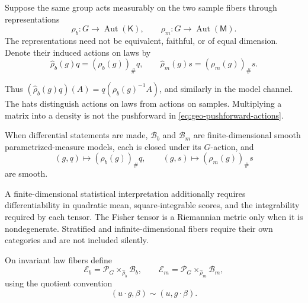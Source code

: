 Suppose the same group acts measurably on the two sample fibers through representations
\begin{equation}
\rho_b:G\longrightarrow\operatorname{Aut}(\mathsf K),
\qquad
\rho_m:G\longrightarrow\operatorname{Aut}(\mathsf M).
\label{eq:geo-representations}
\end{equation}
The representations need not be equivalent, faithful, or of equal dimension.  Denote their
induced actions on laws by
\begin{equation}
\widehat\rho_b(g)q=(\rho_b(g))_\#q,
\qquad
\widehat\rho_m(g)s=(\rho_m(g))_\#s.
\label{eq:geo-pushforward-actions}
\end{equation}

Thus $(\widehat\rho_b(g)q)(A)=q(\rho_b(g)^{-1}A)$, and similarly in the model channel.  The hats
distinguish actions on laws from actions on samples.  Multiplying a matrix into a
density is not the pushforward in \eqref{eq:geo-pushforward-actions}.

\medskip
{}
When differential statements are made, $\mathcal B_b$ and $\mathcal B_m$ are finite-dimensional
smooth parametrized-measure models, each is closed under its $G$-action, and
\begin{equation}
(g,q)\longmapsto(\rho_b(g))_\#q,
\qquad
(g,s)\longmapsto(\rho_m(g))_\#s
\label{eq:geo-smooth-actions}
\end{equation}
are smooth. 
\medskip

A finite-dimensional statistical interpretation additionally requires differentiability in
quadratic mean, square-integrable scores, and the integrability required by each tensor.  The
Fisher tensor is a Riemannian metric only when it is nondegenerate.  Stratified and
infinite-dimensional fibers require their own categories and are not included silently.

On invariant law fibers define
\begin{equation}
\mathcal E_b=\mathscr P_G\times_{\widehat\rho_b}\mathcal B_b,
\qquad
\mathcal E_m=\mathscr P_G\times_{\widehat\rho_m}\mathcal B_m,
\label{eq:geo-associated-bundles}
\end{equation}
using the quotient convention
\begin{equation}
(u\cdot g,\beta)\sim(u,g\cdot\beta).
\label{eq:geo-quotient-convention}
\end{equation}

